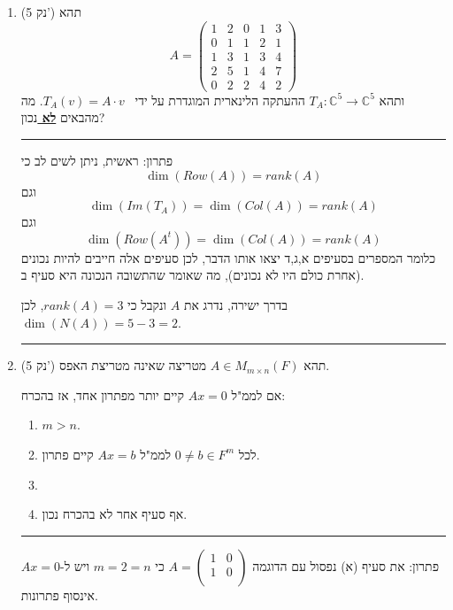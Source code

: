 \documentclass[12pt, a4paper]{article}
\newcommand{\cc}{\mathbb{C}}
\newcommand{\im}{\mathrm{Im}}
\newcommand{\points}[1]{(#1 נק') }
\DeclareMathOperator{\row}{Row}
\begin{document}
\begin{enumerate}
\item\points{5}
תהא
\[A=\begin{pmatrix} 
1 & 2 & 0 & 1 & 3 \\
0 & 1 & 1 & 2 & 1 \\
1 & 3 & 1 & 3 & 4 \\
2 & 5 & 1 & 4 & 7 \\
0 & 2 & 2 & 4 & 2
\end{pmatrix}\]
ותהא
$T_A:\cc^5\to \cc^5$
ההעתקה הלינארית המוגדרת 
על ידי
\ 
$T_A(v) = A\cdot v$.
מה מהבאים
\textbf{
\underline{
לא
}}
נכון?
\begin{enumerate}
\begin{multicols}{2}
    \item $\dim(\row(A))=2$
        \item $\boxed{\dim(N(A))=2}$
    \item $\dim(\im(T_A)) = 2$
    \item $\dim(\row(A^t))=2$
\end{multicols}
\end{enumerate}

\noindent\rule{\textwidth-30pt}{0.4pt}


פתרון:
ראשית, ניתן לשים לב כי
$$\dim(Row(A))=rank(A)$$
וגם
$$\dim(Im(T_A))=\dim(Col(A))=rank(A)$$
וגם
$$\dim(Row(A^t))=\dim(Col(A))=rank(A)$$
כלומר המספרים בסעיפים
א,ג,ד יצאו אותו הדבר, לכן סעיפים אלה חייבים להיות נכונים (אחרת כולם היו לא נכונים), מה שאומר שהתשובה הנכונה היא סעיף ב.

בדרך ישירה, נדרג את
$A$
ונקבל כי
$rank(A)=3$,
לכן
$\dim(N(A))=5-3=2$.

\noindent\rule{\textwidth-30pt}{0.4pt}

\item\points{5}
תהא
$A\in M_{m\times n} (F)$ מטריצה שאינה מטריצת האפס.

אם לממ"ל
$A x=0$
קיים יותר מפתרון אחד, 
אז בהכרח:
\begin{enumerate}
  \item $m>n$.
	\item  לכל $0 \ne b\in F^m$ לממ"ל  $Ax=b$ קיים פתרון.
	\item
	\item  אף סעיף אחר לא בהכרח נכון.
\end{enumerate}
\noindent\rule{\textwidth-30pt}{0.4pt}

פתרון: את סעיף (א) נפסול עם הדוגמה
$A=\begin{pmatrix}
     1&0\\
    1&0\\
\end{pmatrix}$
כי
$m=2=n$
ויש ל-$Ax=0$ אינסוף פתרונות.


\end{enumerate}
\end{document}
